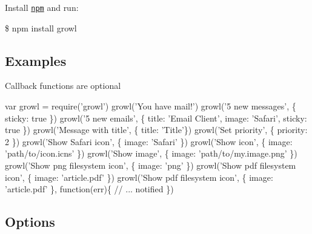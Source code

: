 Install \href{http://npmjs.org/}{\tt npm} and run\+:

\$ npm install growl

\subsection*{Examples}

Callback functions are optional


\begin{DoxyCode}
var growl = require('growl')
growl('You have mail!')
growl('5 new messages', \{ sticky: true \})
growl('5 new emails', \{ title: 'Email Client', image: 'Safari', sticky: true \})
growl('Message with title', \{ title: 'Title'\})
growl('Set priority', \{ priority: 2 \})
growl('Show Safari icon', \{ image: 'Safari' \})
growl('Show icon', \{ image: 'path/to/icon.icns' \})
growl('Show image', \{ image: 'path/to/my.image.png' \})
growl('Show png filesystem icon', \{ image: 'png' \})
growl('Show pdf filesystem icon', \{ image: 'article.pdf' \})
growl('Show pdf filesystem icon', \{ image: 'article.pdf' \}, function(err)\{
  // ... notified
\})
\end{DoxyCode}


\subsection*{Options}



